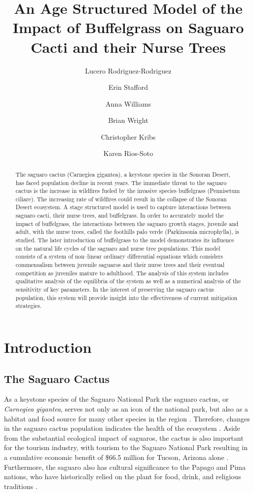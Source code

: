 \documentclass[a4paper]{article}
\title{An Age Structured Model of the Impact of Buffelgrass on Saguaro Cacti and their Nurse Trees}
\author[1]{Lucero Rodriguez-Rodriguez}
\author[2]{Erin Stafford}
\author[3]{Anna Williams}
\author[4]{Brian Wright}
\author[5]{Christopher Kribs}
\author[6]{Karen Rios-Soto}
\affil[1]{University of Texas Rio Grande Valley}
\affil[2]{Tulane University}
\affil[3]{University of Texas at Austin}
\affil[4]{University of Redlands}
\affil[5]{University of Texas at Arlington}
\affil[6]{University of Puerto Rico at Mayaguez}
\begin{document}
\maketitle

\begin{abstract}
The saguaro cactus (Carnegiea gigantea), a keystone species in the Sonoran Desert, has faced population decline in recent years. The immediate threat to the saguaro cactus is the increase in wildfires fueled by the invasive species buffelgrass (Pennisetum ciliare). The increasing rate of wildfires could result in the collapse of the Sonoran Desert ecosystem. A stage structured model is used to capture interactions between saguaro cacti, their nurse trees, and buffelgrass. In order to accurately model the impact of buffelgrass, the interactions between the saguaro growth stages, juvenile and adult, with the nurse trees, called the foothills palo verde (Parkinsonia microphylla), is studied. The later introduction of buffelgrass to the model demonstrates its influence on the natural life cycles of the saguaro and nurse tree populations. This model consists of a system of non--linear ordinary differential equations which considers commensalism between juvenile saguaros and their nurse trees and their eventual competition as juveniles mature to adulthood. The analysis of this system includes qualitative analysis of the equilibria of the system as well as a numerical analysis of the sensitivity of key parameters. In the interest of preserving the saguaro cactus population, this system will provide insight into the effectiveness of current mitigation strategies. 
\end{abstract}

\section{Introduction}
\subsection{The Saguaro Cactus}
As a keystone species of the Saguaro National Park the saguaro cactus, or {\it{Carnegiea gigantea}}, serves not only as an icon of the national park, but also as a habitat and food source for many other species in the region \cite{keystoneDrezner}. Therefore, changes in the saguaro cactus population indicates the health of the  ecosystem \cite{keystoneDrezner}. Aside from the substantial ecological impact of saguaros, the cactus is also important for the tourism industry, with tourism to the Saguaro National Park resulting in a cumulative economic benefit of \$66.5 million  for Tucson, Arizona alone \cite{tourism}. Furthermore, the saguaro also has cultural significance to the Papago and Pima nations, who have historically relied on the plant for food, drink, and religious traditions \cite{keystoneDrezner}.\\
\end{document}
